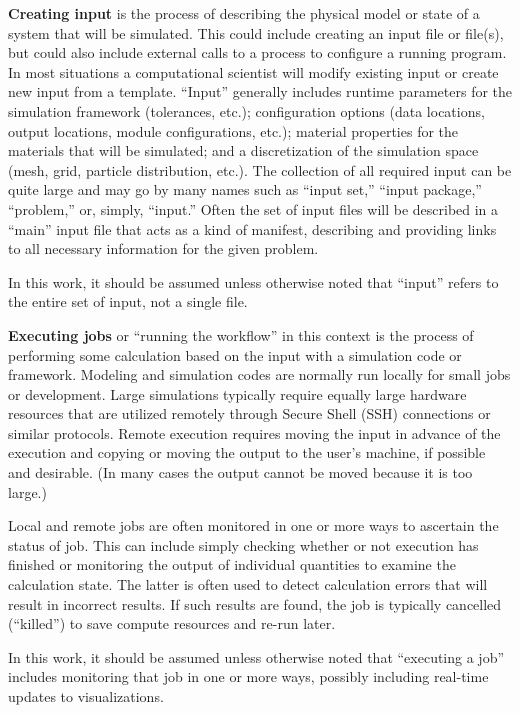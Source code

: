 \textbf{Creating input} is the process of describing the physical model
or state of a system that will be simulated. This could include creating
an input file or file(s), but could also include external calls to a
process to configure a running program. In most situations a
computational scientist will modify existing input or create new input
from a template. ``Input'' generally includes runtime parameters for the
simulation framework (tolerances, etc.); configuration options (data
locations, output locations, module configurations, etc.); material
properties for the materials that will be simulated; and a
discretization of the simulation space (mesh, grid, particle
distribution, etc.). The collection of all required input can be quite
large and may go by many names such as ``input set,'' ``input package,''
``problem,'' or, simply, ``input.'' Often the set of input files will be
described in a ``main'' input file that acts as a kind of manifest,
describing and providing links to all necessary information for the
given problem.

In this work, it should be assumed unless otherwise noted that ``input''
refers to the entire set of input, not a single file.

\textbf{Executing jobs} or ``running the workflow'' in this context is
the process of performing some calculation based on the input with a
simulation code or framework. Modeling and simulation codes are normally
run locally for small jobs or development. Large simulations typically
require equally large hardware resources that are utilized remotely
through Secure Shell (SSH) connections or similar protocols. Remote
execution requires moving the input in advance of the execution and
copying or moving the output to the user's machine, if possible and
desirable. (In many cases the output cannot be moved because it is too
large.)

Local and remote jobs are often monitored in one or more ways to
ascertain the status of job. This can include simply checking whether or
not execution has finished or monitoring the output of individual
quantities to examine the calculation state. The latter is often used to
detect calculation errors that will result in incorrect results. If such
results are found, the job is typically cancelled (``killed'') to save
compute resources and re-run later.

In this work, it should be assumed unless otherwise noted that
``executing a job'' includes monitoring that job in one or more ways,
possibly including real-time updates to visualizations.

